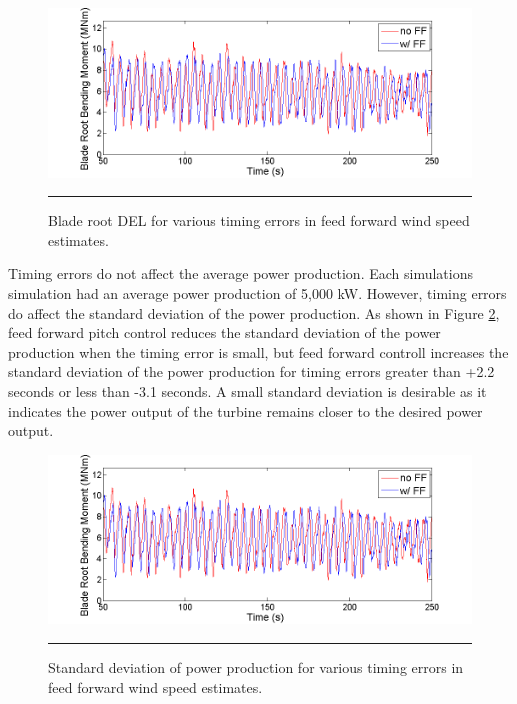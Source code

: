 \begin{figure}[htbp]
	\centering
		\includegraphics[trim = {1cm 0 2cm 0}, clip, width = \linewidth]{Figures/ch3Figures/fig3-35.png}
		\rule{35em}{0.5pt}
	\caption{Blade root DEL for various timing errors in feed forward wind speed estimates.}
	\label{fig3-37}
\end{figure}

Timing errors do not affect the average power production. Each simulations simulation had an average power production of 5,000 kW. However, timing errors do affect the standard deviation of the power production. As shown in Figure \ref{fig3-38}, feed forward pitch control reduces the standard deviation of the power production when the timing error is small, but feed forward controll increases the standard deviation of the power production for timing errors greater than +2.2 seconds or less than -3.1 seconds. A small standard deviation is desirable as it indicates the power output of the turbine remains closer to the desired power output.

\begin{figure}[htbp]
	\centering
		\includegraphics[trim = {1cm 0 2cm 0}, clip, width = \linewidth]{Figures/ch3Figures/fig3-35.png}
		\rule{35em}{0.5pt}
	\caption{Standard deviation of power production for various timing errors in feed forward wind speed estimates.}
	\label{fig3-38}
\end{figure}

